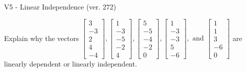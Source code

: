 \begin{exercise}
  \begin{exerciseTitle}V5 - Linear Independence (ver. 272)\end{exerciseTitle}
  \begin{exerciseStatement}
    Explain why the vectors \(\left[\begin{array}{r}
3 \\
-3 \\
2 \\
4 \\
-4
\end{array}\right] , \left[\begin{array}{r}
1 \\
-3 \\
-5 \\
-2 \\
4
\end{array}\right] , \left[\begin{array}{r}
5 \\
-5 \\
-4 \\
-2 \\
0
\end{array}\right] , \left[\begin{array}{r}
1 \\
-3 \\
-3 \\
5 \\
-6
\end{array}\right] , \text{ and } \left[\begin{array}{r}
1 \\
1 \\
3 \\
-6 \\
0
\end{array}\right]\) are linearly dependent or linearly independent.	



\end{exerciseStatement}
\end{exercise}
